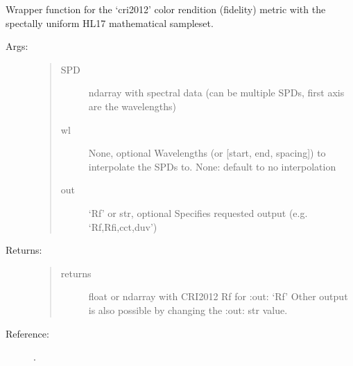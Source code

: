 \documentclass[letterpaper,10pt,english]{sphinxmanual}
\begin{document}
\begin{fulllineitems}
\label{\detokenize{color:luxpy.color.cri.spd_to_cri2012_hl17}}
Wrapper function for the ‘cri2012’ color rendition (fidelity) metric
with the spectally uniform HL17 mathematical sampleset.
\begin{description}
\item[{Args:}] \leavevmode\begin{quote}\begin{description}
\item[{SPD}] \leavevmode
ndarray with spectral data (can be multiple SPDs, 
first axis are the wavelengths)

\item[{wl}] \leavevmode
None, optional
Wavelengths (or {[}start, end, spacing{]}) to interpolate the SPDs to. 
None: default to no interpolation

\item[{out}] \leavevmode
‘Rf’ or str, optional
Specifies requested output (e.g. ‘Rf,Rfi,cct,duv’)

\end{description}\end{quote}

\item[{Returns:}] \leavevmode\begin{quote}\begin{description}
\item[{returns}] \leavevmode
float or ndarray with CRI2012 Rf for :out: ‘Rf’
Other output is also possible by changing the :out: str value.

\end{description}\end{quote}

\item[{Reference:}] . 

\end{description}

\end{fulllineitems}

\end{document}
